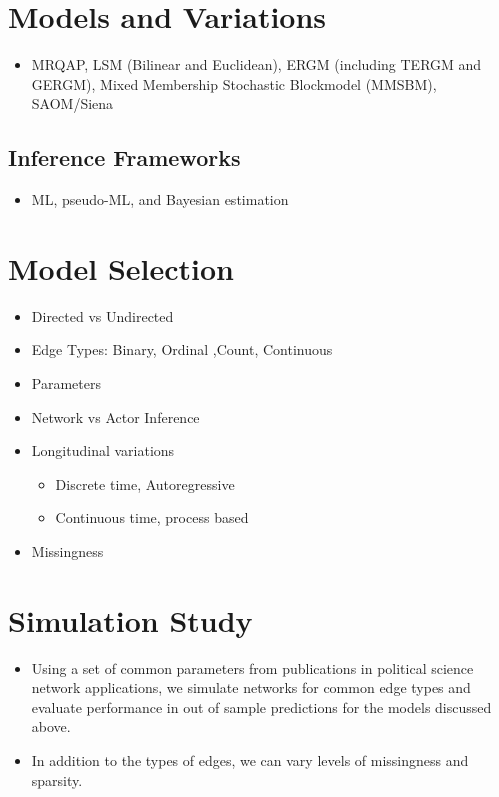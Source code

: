 \documentclass[fleqn,12pt]{wlscirep}
\begin{document}
\section*{Models and Variations}

\begin{itemize}
\item MRQAP, LSM (Bilinear and Euclidean), ERGM (including TERGM and GERGM), Mixed Membership Stochastic Blockmodel (MMSBM), SAOM/Siena

\end{itemize}

\subsection*{Inference Frameworks}

\begin{itemize}
\item ML, pseudo-ML, and Bayesian estimation 

\end{itemize}

\section*{Model Selection}

\begin{itemize}
\item Directed vs Undirected
\item Edge Types: Binary, Ordinal ,Count, Continuous
\item Parameters
\item Network vs Actor Inference
\item Longitudinal variations 
	\begin{itemize}
	\item Discrete time, Autoregressive
	\item Continuous time, process based
	\end{itemize}
\item Missingness
\end{itemize}



\section*{Simulation Study}

\begin{itemize}
\item Using a set of common parameters from publications in political science network applications, we simulate networks for common edge types and evaluate performance in out of sample predictions for the models discussed above.
\item In addition to the types of edges, we can vary levels of missingness and sparsity.

\end{itemize}

\newpage


\end{document}
